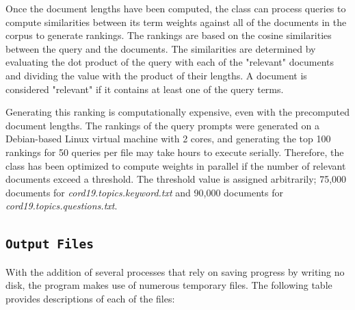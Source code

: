\documentclass[11pt]{article}
\begin{document}
Once the document lengths have been computed, the class can process queries to compute similarities between its term weights against all of the documents in the corpus to generate rankings. The rankings are based on the cosine similarities between the query and the documents. The similarities are determined by evaluating the dot product of the query with each of the "relevant" documents and dividing the value with the product of their lengths. A document is considered "relevant" if it contains at least one of the query terms.

Generating this ranking is computationally expensive, even with the precomputed document lengths. The rankings of the query prompts were generated on a Debian-based Linux virtual machine with 2 cores, and generating the top 100 rankings for 50 queries per file may take hours to execute serially. Therefore, the class has been optimized to compute weights in parallel if the number of relevant documents exceed a threshold. The threshold value is assigned arbitrarily; 75,000 documents for \textit{cord19.topics.keyword.txt} and 90,000 documents for \textit{cord19.topics.questions.txt}.

\subsection{\texttt{Output Files}}
With the addition of several processes that rely on saving progress by writing no disk, the program makes use of numerous temporary files. The following table provides descriptions of each of the files:
\end{document}
